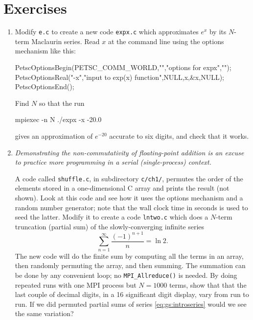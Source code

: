 \bigskip
\section{Exercises}

\renewcommand{\labelenumi}{\arabic{chapter}.\arabic{enumi}\quad}
\begin{enumerate}

\item \label{exer:gs:expx}  Modify \texttt{e.c} to create a new code \texttt{expx.c} which approximates $e^x$ by its $N$-term Maclaurin series.  Read $x$ at the command line using the \PETSc options mechanism like this:
\begin{code}
  PetscOptionsBegin(PETSC_COMM_WORLD,"","options for expx","");
  PetscOptionsReal("-x","input to exp(x) function",NULL,x,&x,NULL);
  PetscOptionsEnd();
\end{code}
Find $N$ so that the run
\begin{cline}
mpiexec -n N ./expx -x -20.0
\end{cline}
gives an approximation of $e^{-20}$ accurate to six digits, and check that it works.

\item \label{exer:gs:nondeterminant}  \emph{Demonstrating the non-commutativity of floating-point addition is an excuse to practice more \PETSc programming in a serial (single-process) context.}

A code called \texttt{shuffle.c}, in subdirectory \texttt{c/ch1/}, permutes the order of the elements stored in a one-dimensional C array and prints the result (not shown).  Look at this code and see how it uses the \PETSc options mechanism and a \PETSc random number generator; note that the wall clock time in seconds is used to seed the latter.  Modify it to create a code \texttt{lntwo.c} which does a $N$-term truncation (partial sum) of the slowly-converging infinite series
\begin{equation}
\sum_{n=1}^\infty \frac{(-1)^{n+1}}{n} = \ln 2.
\label{eq:gs:lntwo}
\end{equation}
The new code will do the finite sum by computing all the terms in an array, then randomly permuting the array, and then summing.  The summation can be done by any convenient loop; no \texttt{MPI\_Allreduce()} is needed.  By doing repeated runs with one MPI process but $N=1000$ terms, show that that the last couple of decimal digits, in a 16 significant digit display, vary from run to run.  If we did permuted partial sums of series \eqref{eq:gs:introseries} would we see the same variation?


\end{enumerate}
